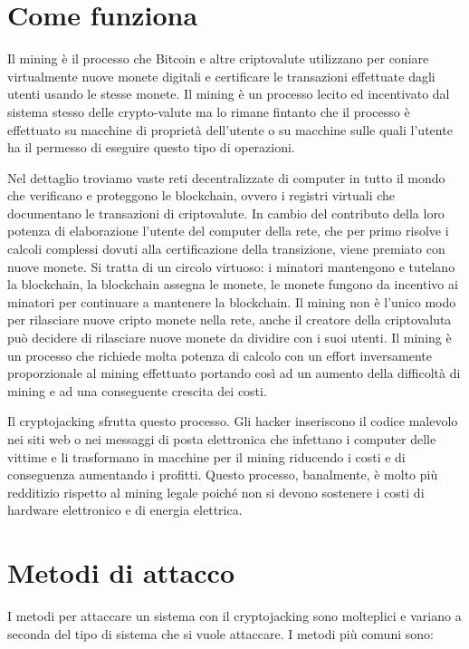 \documentclass[12pt,a4paper]{article}
\begin{document}
\newpage

\section{Come funziona}
Il mining è il processo che Bitcoin e altre criptovalute utilizzano per coniare
virtualmente nuove monete digitali e certificare le transazioni effettuate dagli
utenti usando le stesse monete. Il mining è un processo lecito ed incentivato dal sistema stesso delle crypto-valute ma lo rimane fintanto che il processo è effettuato su macchine di proprietà dell'utente o su macchine sulle quali l'utente ha il permesso di eseguire questo tipo di operazioni.

Nel dettaglio troviamo vaste reti decentralizzate di computer in tutto il mondo
che verificano e proteggono le blockchain, ovvero i registri virtuali che
documentano le transazioni di criptovalute. In cambio del contributo della loro
potenza di elaborazione l'utente del computer della rete, che per primo risolve
i calcoli complessi dovuti alla certificazione della transizione, viene premiato
con nuove monete. Si tratta di un circolo virtuoso: i minatori mantengono e
tutelano la blockchain, la blockchain assegna le monete, le monete fungono da
incentivo ai minatori per continuare a mantenere la blockchain. Il mining non è
l'unico modo per rilasciare nuove cripto monete nella rete, anche il creatore
della criptovaluta può decidere di rilasciare nuove monete da dividire con i
suoi utenti. Il mining è un processo che richiede molta potenza di calcolo con
un effort inversamente proporzionale al mining effettuato portando così ad un
aumento della difficoltà di mining e ad una conseguente crescita dei costi.

Il cryptojacking sfrutta questo processo. Gli hacker inseriscono il codice malevolo
nei siti web o nei messaggi di posta elettronica che infettano i computer delle
vittime e li trasformano in macchine per il mining riducendo i costi e di conseguenza aumentando i profitti. Questo processo, banalmente, è molto più redditizio rispetto al mining legale poiché non si devono sostenere i costi di hardware elettronico e di energia elettrica.

\newpage

\section{Metodi di attacco}
I metodi per attaccare un sistema con il cryptojacking sono molteplici e variano
a seconda del tipo di sistema che si vuole attaccare. I metodi più comuni sono:
\end{document}
